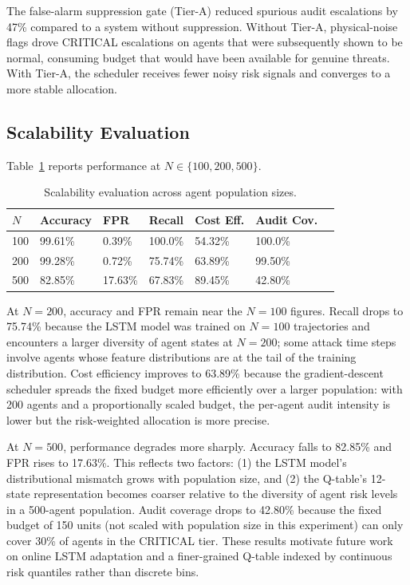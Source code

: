 The false-alarm suppression gate (Tier-A) reduced spurious audit escalations by 47\% compared to
a system without suppression. Without Tier-A, physical-noise flags drove CRITICAL escalations on
agents that were subsequently shown to be normal, consuming budget that would have been available
for genuine threats. With Tier-A, the scheduler receives fewer noisy risk signals and converges to
a more stable allocation.

\subsection{Scalability Evaluation}
\label{sec:scalability}

Table~\ref{tab:scalability} reports performance at $N \in \{100, 200, 500\}$.

\begin{table}[htbp]
\centering
\caption{Scalability evaluation across agent population sizes.}
\label{tab:scalability}
\begin{tabular}{@{}lllllll@{}}
\hline
$N$ & \textbf{Accuracy} & \textbf{FPR} & \textbf{Recall} & \textbf{Cost Eff.} & \textbf{Audit Cov.} \\
\hline
100 & 99.61\% & 0.39\% & 100.0\%  & 54.32\% & 100.0\% \\
200 & 99.28\% & 0.72\% & 75.74\%  & 63.89\% & 99.50\% \\
500 & 82.85\% & 17.63\% & 67.83\% & 89.45\% & 42.80\% \\
\hline
\end{tabular}
\end{table}

At $N = 200$, accuracy and FPR remain near the $N = 100$ figures. Recall drops to 75.74\% because
the LSTM model was trained on $N = 100$ trajectories and encounters a larger diversity of agent
states at $N = 200$; some attack time steps involve agents whose feature distributions are at the
tail of the training distribution. Cost efficiency improves to 63.89\% because the gradient-descent
scheduler spreads the fixed budget more efficiently over a larger population: with 200 agents and
a proportionally scaled budget, the per-agent audit intensity is lower but the risk-weighted
allocation is more precise.

At $N = 500$, performance degrades more sharply. Accuracy falls to 82.85\% and FPR rises to
17.63\%. This reflects two factors: (1) the LSTM model's distributional mismatch grows with
population size, and (2) the Q-table's 12-state representation becomes coarser relative to the
diversity of agent risk levels in a 500-agent population. Audit coverage drops to 42.80\% because
the fixed budget of 150 units (not scaled with population size in this experiment) can only cover
30\% of agents in the CRITICAL tier. These results motivate future work on online LSTM adaptation
and a finer-grained Q-table indexed by continuous risk quantiles rather than discrete bins.

